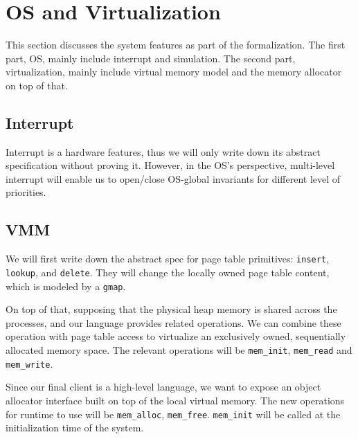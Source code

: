 \section{OS and Virtualization}
\label{sec:osvirt}

This section discusses the system features as part of the formalization.
The first part, OS, mainly include interrupt and simulation.
The second part, virtualization, mainly include virtual memory model and
the memory allocator on top of that.

\subsection{Interrupt}

Interrupt is a hardware features, thus we will only write down its abstract specification
without proving it. However, in the OS's perspective, multi-level interrupt will enable us to
open/close OS-global invariants for different level of priorities.

\subsection{VMM}

We will first write down the abstract spec for page table primitives:
\texttt{insert}, \texttt{lookup}, and \texttt{delete}. They will change the
locally owned page table content, which is modeled by a \texttt{gmap}.

On top of that, supposing that the physical heap memory is shared across the processes,
and our language provides related operations. We can combine these operation with
page table access to virtualize an exclusively owned, sequentially allocated memory space.
The relevant operations will be \texttt{mem\_init}, \texttt{mem\_read} and \texttt{mem\_write}.

Since our final client is a high-level language, we want to expose an object allocator interface
built on top of the local virtual memory. The new operations for runtime to use will be
\texttt{mem\_alloc}, \texttt{mem\_free}.
\texttt{mem\_init} will be called at the initialization time of the system.
